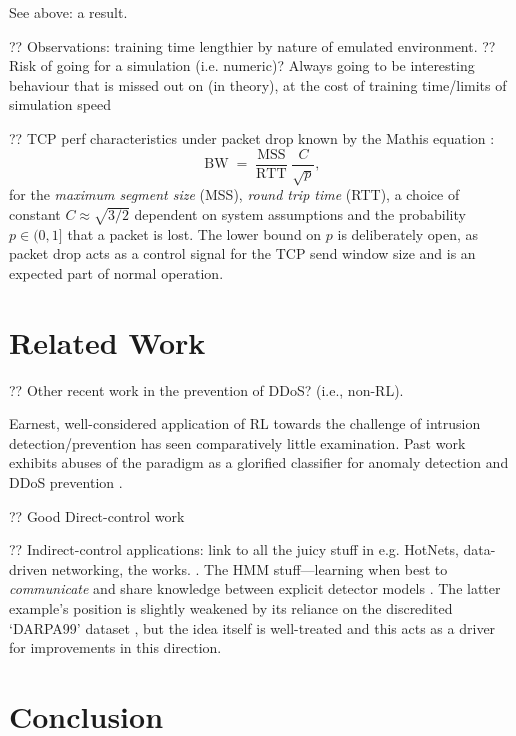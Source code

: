 \documentclass[conference, letterpaper, 10pt, times]{IEEEtran}
\begin{document}
See above: a result.

?? Observations: training time lengthier by nature of emulated environment.
?? Risk of going for a simulation (i.e. numeric)? Always going to be interesting behaviour that is missed out on (in theory), at the cost of training time/limits of simulation speed

?? TCP perf characteristics under packet drop known by the Mathis equation \cite{DBLP:journals/ccr/MathisSMO97}:
\begin{equation}
\operatorname{BW} = \frac{\operatorname{MSS}}{\operatorname{RTT}} \frac{C}{\sqrt{p}},
\end{equation}
for the \emph{maximum segment size} (MSS), \emph{round trip time} (RTT), a choice of constant $C \approx{} \sqrt{3/2}$ dependent on system assumptions and the probability $p \in (0, 1]$ that a packet is lost.
The lower bound on $p$ is deliberately open, as packet drop acts as a control signal for the TCP send window size and is an expected part of normal operation.

\section{Related Work}

?? Other recent work in the prevention of DDoS? (i.e., non-RL).

Earnest, well-considered application of RL towards the challenge of intrusion detection/prevention has seen comparatively little examination.
Past work exhibits abuses of the paradigm as a glorified classifier for anomaly detection \cite{shamshirband2014anomaly} and DDoS prevention \cite{DBLP:conf/mates/ServinK08}.

?? Good Direct-control work \cite{DBLP:phd/ethos/Malialis14, DBLP:journals/eaai/MalialisK15}

?? Indirect-control applications: link to all the juicy stuff in e.g. HotNets, data-driven networking, the works. \cite{DBLP:conf/hotnets/ValadarskySST17, DBLP:conf/hotnets/MaoAMK16}.
The HMM stuff---learning when best to \emph{communicate} and share knowledge between explicit detector models \cite{DBLP:conf/paisi/XuSH07}.
The latter example's position is slightly weakened by its reliance on the discredited `DARPA99' dataset \cite{DARPA-IDD, DBLP:conf/cisda/TavallaeeBLG09, DBLP:conf/sp/SommerP10}, but the idea itself is well-treated and this acts as a driver for improvements in this direction.

\section{Conclusion}
\end{document}
